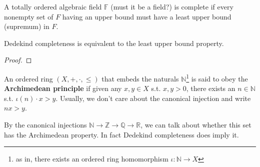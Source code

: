 \documentclass{article}
\begin{document}
      \begin{definition}
        A totally ordered algebraic field $\mathbb{F}$ (must it be a field?) is complete if every nonempty set of $F$ having an upper bound must have a least upper bound (supremum) in $F$. 
      \end{definition}

      \begin{theorem}
        Dedekind completeness is equivalent to the least upper bound property. 
      \end{theorem}
      \begin{proof}
        
      \end{proof}

      \begin{definition}
        An ordered ring $(X, +, \cdot, \leq)$ that embeds the naturals $\mathbb{N}$\footnote{as in, there exists an ordered ring homomorphism $\iota: \mathbb{N} \rightarrow X$} is said to obey the \textbf{Archimedean principle} if given any $x, y \in X$ s.t. $x, y > 0$, there exists an $n \in \mathbb{N}$ s.t. $\iota(n) \cdot x > y$. Usually, we don't care about the canonical injection and write $nx > y$. 
      \end{definition}

      By the canonical injections $\mathbb{N} \rightarrow \mathbb{Z} \rightarrow \mathbb{Q} \rightarrow \mathbb{R}$, we can talk about whether this set has the Archimedean property. In fact Dedekind completeness does imply it. 
\end{document}
